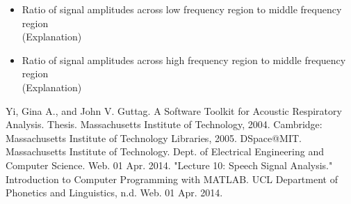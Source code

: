 \documentclass{article}
\begin{document}
\begin{itemize}
\item
	Ratio of signal amplitudes across low frequency region to middle frequency region\\
	(Explanation)\\
\item
	Ratio of signal amplitudes across high frequency region to middle frequency region\\
	(Explanation)\\
\end{itemize}

\newpage

\begin{thebibliography}{9}

	Yi, Gina A., and John V. Guttag. A Software Toolkit for Acoustic Respiratory Analysis. Thesis. Massachusetts Institute of Technology, 2004. Cambridge: Massachusetts Institute of Technology Libraries, 2005. DSpace@MIT. Massachusetts Institute of Technology. Dept. of Electrical Engineering and Computer Science. Web. 01 Apr. 2014.
	"Lecture 10: Speech Signal Analysis." Introduction to Computer Programming with MATLAB. UCL Department of Phonetics and Linguistics, n.d. Web. 01 Apr. 2014.

\end{thebibliography}
\end{document}
